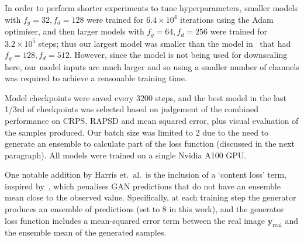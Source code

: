 \documentclass{article}
\begin{document}
 In order to perform shorter experiments to tune hyperparameters, smaller models with $f_g=32, f_d=128$ were trained for $6.4\times 10^4$ iterations using the Adam optimiser, and then larger models with $f_g=64, f_d=256$ were trained for $3.2\times10^5$ steps; thus our largest model was smaller than the model in~\cite{harris_generative_2022} that had $f_g=128, f_d=512$. However, since the model is not being used for downscaling here, our model inputs are much larger and so using a smaller number of channels was required to achieve a reasonable training time. 

 
 Model checkpoints were saved every 3200 steps, and the best model in the last 1/3rd of checkpoints was selected based on judgement of the combined performance on CRPS, RAPSD and mean squared error, plus visual evaluation of the samples produced. Our batch size was limited to 2 due to the need to generate an ensemble to calculate part of the loss function (discussed in the next paragraph). All models were trained on a single Nvidia A100 GPU.

One notable addition by Harris et.~al.~is the inclusion of a `content loss' term, inspired by~\cite{ravuri_skilful_2021}, which penalises GAN predictions that do not have an ensemble mean close to the observed value. Specifically, at each training step the generator produces an ensemble of predictions (set to 8 in this work), and the generator loss function includes a mean-squared error term between the real image $\mathbf{y}_{\text{real}}$ and the ensemble mean of the generated samples.

\end{document}
